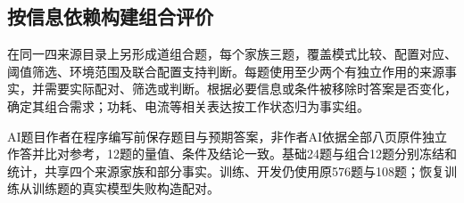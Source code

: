 \subsection{按信息依赖构建组合评价}
\label{sec:composition-data}

在同一四来源目录上另形成\CompositionQuestionCount{}道组合题，每个家族三题，覆盖模式比较、配置对应、阈值筛选、环境范围及联合配置支持判断。每题使用至少两个有独立作用的来源事实，并需要实际配对、筛选或判断。根据必要信息或条件被移除时答案是否变化，确定其组合需求；功耗、电流等相关表达按工作状态归为事实组。

AI题目作者在程序编写前保存题目与预期答案，非作者AI依据全部八页原件独立作答并比对参考，12题的量值、条件及结论一致。基础24题与组合12题分别冻结和统计，共享四个来源家族和部分事实。训练、开发仍使用原576题与108题；恢复训练从训练题的真实模型失败构造配对。

